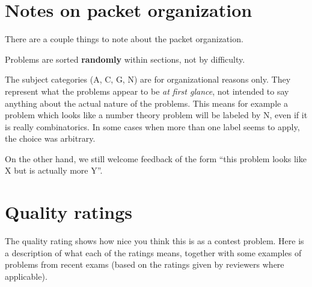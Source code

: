 \section{Notes on packet organization}
There are a couple things to note about the packet organization.
\begin{itemize}
  \ii Problems are sorted \textbf{randomly}
  within sections, not by difficulty.

  \ii The subject categories (A, C, G, N)
  are for organizational reasons only.
  They represent what the problems appear
  to be \emph{at first glance},
  not intended to say anything about the
  actual nature of the problems.
  This means for example a problem which looks
  like a number theory problem will be labeled by N,
  even if it is really combinatorics.
  In some cases when more than one label seems to apply,
  the choice was arbitrary.

  On the other hand, we still welcome feedback of the form
  ``this problem looks like X but is actually more Y''.
\end{itemize}

\section{Quality ratings}
The quality rating shows how nice you think this is as a contest problem.
Here is a description of what each of the ratings means,
together with some examples of problems from recent exams
(based on the ratings given by reviewers where applicable).

